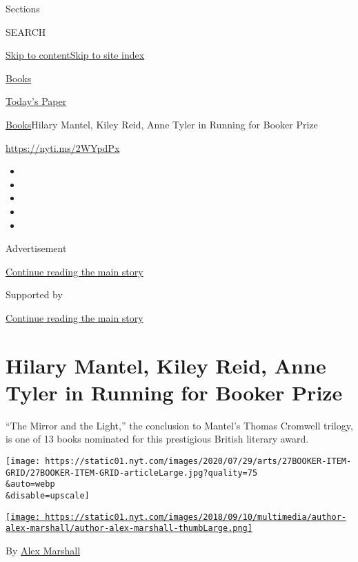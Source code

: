 Sections

SEARCH

\protect\hyperlink{site-content}{Skip to
content}\protect\hyperlink{site-index}{Skip to site index}

\href{https://www.nytimes.com/section/books}{Books}

\href{https://myaccount.nytimes.com/auth/login?response_type=cookie\&client_id=vi}{}

\href{https://www.nytimes.com/section/todayspaper}{Today's Paper}

\href{/section/books}{Books}\textbar{}Hilary Mantel, Kiley Reid, Anne
Tyler in Running for Booker Prize

\url{https://nyti.ms/2WYpdPx}

\begin{itemize}
\item
\item
\item
\item
\item
\end{itemize}

Advertisement

\protect\hyperlink{after-top}{Continue reading the main story}

Supported by

\protect\hyperlink{after-sponsor}{Continue reading the main story}

\hypertarget{hilary-mantel-kiley-reid-anne-tyler-in-running-for-booker-prize}{%
\section{Hilary Mantel, Kiley Reid, Anne Tyler in Running for Booker
Prize}\label{hilary-mantel-kiley-reid-anne-tyler-in-running-for-booker-prize}}

``The Mirror and the Light,'' the conclusion to Mantel's Thomas Cromwell
trilogy, is one of 13 books nominated for this prestigious British
literary award.

\texttt{[image: https://static01.nyt.com/images/2020/07/29/arts/27BOOKER-ITEM-GRID/27BOOKER-ITEM-GRID-articleLarge.jpg?quality=75\\\&auto=webp\\\&disable=upscale]}

\href{https://www.nytimes.com/by/alex-marshall}{\texttt{[image: https://static01.nyt.com/images/2018/09/10/multimedia/author-alex-marshall/author-alex-marshall-thumbLarge.png]}}

By \href{https://www.nytimes.com/by/alex-marshall}{Alex Marshall}

